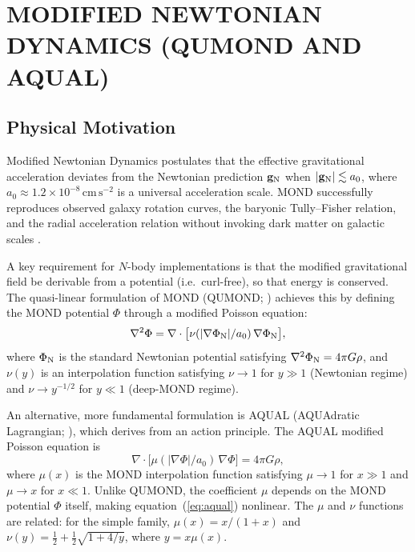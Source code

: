\documentclass[fleqn,usenatbib]{mnras}
\newcommand{\azero}{a_0}
\newcommand{\gN}{\mathbf{g}_{\rm N}}
\begin{document}
\section{MODIFIED NEWTONIAN DYNAMICS (QUMOND AND AQUAL)}
\label{sec:mond}

\subsection{Physical Motivation}
\label{sec:mond_motivation}

Modified Newtonian Dynamics \citep{Milgrom1983} postulates that the
effective gravitational acceleration deviates from the Newtonian
prediction $\gN$ when $|\gN| \lesssim \azero$, where $\azero \approx
1.2 \times 10^{-8}\,\mathrm{cm\,s^{-2}}$ is a universal acceleration
scale.  MOND successfully reproduces observed galaxy rotation curves,
the baryonic Tully--Fisher relation, and the radial acceleration
relation without invoking dark matter on galactic scales
\citep{Famaey2012,Milgrom2014,McGaugh2016}.

A key requirement for $N$-body implementations is that the modified
gravitational field be derivable from a potential (i.e.\ curl-free), so
that energy is conserved.  The quasi-linear formulation of MOND
(QUMOND; \citealt{Milgrom2010}) achieves this by defining the MOND
potential $\Phi$ through a modified Poisson equation:
\begin{equation}
\nabla^2 \Phi = \nabla \cdot \bigl[\nu(|\nabla\Phi_{\rm N}|/\azero)
\,\nabla\Phi_{\rm N}\bigr],
\label{eq:qumond}
\end{equation}
where $\Phi_{\rm N}$ is the standard Newtonian potential satisfying
$\nabla^2 \Phi_{\rm N} = 4\pi G\rho$, and $\nu(y)$ is an
interpolation function satisfying $\nu \to 1$ for $y \gg 1$
(Newtonian regime) and $\nu \to y^{-1/2}$ for $y \ll 1$ (deep-MOND
regime).

An alternative, more fundamental formulation is AQUAL (AQUAdratic
Lagrangian; \citealt{Bekenstein1984}), which derives from an action
principle.  The AQUAL modified Poisson equation is
\begin{equation}
\nabla \cdot \bigl[\mu(|\nabla\Phi|/\azero)\,\nabla\Phi\bigr]
= 4\pi G\rho,
\label{eq:aqual}
\end{equation}
where $\mu(x)$ is the MOND interpolation function satisfying
$\mu \to 1$ for $x \gg 1$ and $\mu \to x$ for $x \ll 1$.  Unlike
QUMOND, the coefficient $\mu$ depends on the MOND potential $\Phi$
itself, making equation~(\ref{eq:aqual}) nonlinear.  The $\mu$ and
$\nu$ functions are related: for the simple family, $\mu(x) = x/(1+x)$
and $\nu(y) = \tfrac{1}{2} + \tfrac{1}{2}\sqrt{1+4/y}$, where
$y = x\mu(x)$.
\end{document}
